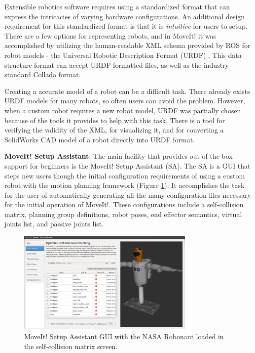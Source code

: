 \documentclass[10pt,journal,compsoc]{joser1}
\begin{document}
{Extensible robotics software requires using a standardized format that can express the intricacies of varying hardware configurations. An additional design requirement for this standardized format is that it is \textit{intuitive} for users to setup. There are a few options for representing robots, and in MoveIt! it was accomplished by utilizing the human-readable XML schema provided by ROS for robot models - the Universal Robotic Description Format (URDF) \cite{urdf}. This data structure format can accept URDF-formatted files, as well as the industry standard Collada \cite{collada} format.

Creating a accurate model of a robot can be a difficult task. There already exists URDF models for many robots, so often users can avoid the problem. However, when a custom robot requires a new robot model, URDF was partially chosen because of the tools it provides to help with this task. There is a tool for verifying the validity of the XML, for visualizing it, and for converting a SolidWorks CAD model of a robot directly into URDF format. 

{\bf MoveIt! Setup Assistant}: The main facility that provides out of the box support for beginners is the MoveIt! Setup Assistant (SA). The SA is a GUI that steps new users though the initial configuration requirements of using a custom robot with the motion planning framework (Figure \ref{fig:setupassistant}). It accomplishes the task for the user of automatically generating all the many configuration files necessary for the initial operation of MoveIt!. These configurations include a self-collision matrix, planning group definitions, robot poses, end effector semantics, virtual joints list, and passive joints list. 

\begin{figure}[!t]
\centering
\includegraphics[width=3.4in]{images/setup_assistant}
\caption{MoveIt! Setup Assistant GUI with the NASA Robonaut loaded in the self-collision matrix screen.}
\label{fig:setupassistant}
\end{figure}

}
\end{document}
